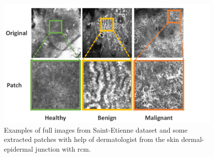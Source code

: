 \begin{figure}[H]
\centering
    \includegraphics[width=\linewidth]{content/figures/Data.pdf}
    \caption{Examples of full images from Saint-Etienne dataset and some extracted patches with help of dermatologist from the skin dermal-epidermal junction with \ac{rcm}.}
    \label{data}
\end{figure}
